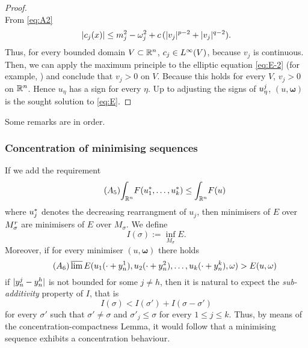 \documentclass[a4paper,12pt,oneside]{amsart}
\theoremstyle{definition}
\theoremstyle{remark}
\theoremstyle{theorem}
\begin{document}
\begin{proof}
\begin{equation}
\end{equation}
From \eqref{eq:A2}
\begin{equation}
\label{eq:maxp-1}
|c_j (x)|\leq m_j\sp 2 - {\mathbf{\omega}}_j\sp 2 + 
c\,(|v_j|\sp{p - 2} + |v_j|\sp{q - 2}).
\end{equation}
Thus, for every bounded domain $ V\subset {{\mathbb{R}}\sp{n}} $, $ c_j\in L\sp\infty (V) $,
because $ v_j $ is continuous. Then, we can apply the maximum
principle to the elliptic equation \eqref{eq:E-2} (for example,
\cite[Lemma~1,p.\,556]{Eva10}) and conclude that $ v_j > 0 $ on $ V $.
Because this holds for every $ V $, $ v_j > 0 $ on $ {{\mathbb{R}}\sp{n}} $. Hence
$ u_\eta $ has a sign for every $ \eta $. Up to adjusting the signs
of $ u_\eta\sp j $, $ (u,{\mathbf{\omega}}) $ is the sought solution to \eqref{eq:E}.
\end{proof}
\noindent Some remarks are in order.
\subsubsection*{Concentration of minimising sequences}
If we add the requirement
\[
\label{eq:A5}
\tag{$ A_5 $}
{\int_{{\mathbb{R}}\sp{n}}} {F}(u_1 \sp *,\dots,u_k \sp *)\leq {\int_{{\mathbb{R}}\sp{n}}} {F}(u)
\]
where $ u_j \sp * $ denotes the decreasing rearrangment of $ u_j $,
then minimisers of $ E $ over 
$ M_{\sigma} \sp r $ are minimisers of $ E $ over $ M_{\sigma} $. We define
\[
I({\sigma}) := \inf_{M_{\sigma}} E.
\]
Moreover, if for every minimiser $ (u,{\mathbf{\omega}}) $ there holds
\[
\label{eq:A6}
\tag{$ A_6 $}
\varlimsup
E(u_1 (\cdot + y_n\sp 1),u_2 (\cdot + y_n \sp 2),\dots,
u_k (\cdot + y_n \sp k),{\mathbf{\omega}}) > E(u,{\mathbf{\omega}})
\]
if $ |y_n \sp j - y_n \sp h| $ is not bounded for some $ j\neq h $,
then it is natural to expect the \textsl{sub-additivity} property
of $ I $, that is
\[
I({\sigma}) < I({\sigma}') + I({\sigma} - {\sigma}')
\]
for every $ {\sigma}' $ such that $ {\sigma}'\neq{\sigma} $ and $ {\sigma}'_j\leq{\sigma} $
for every $ 1\leq j\leq k $. Thus, by means of the concentration-compactness 
Lemma, it would follow that a minimising sequence exhibits a
concentration behaviour.
\end{document}
